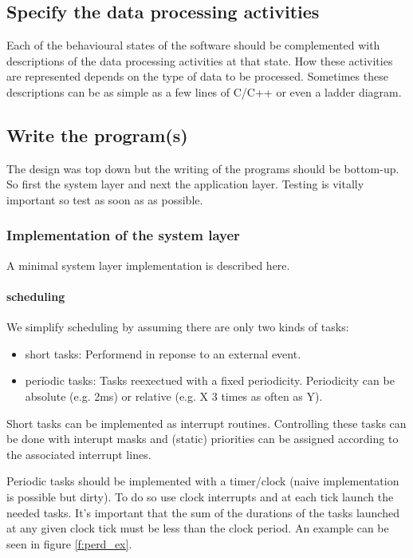 \documentclass[../main.tex]{subfiles}
\begin{document}
\subsection{Specify the data processing activities}
\label{sss:activities}
Each of the behavioural states of the software should be complemented with descriptions of the data processing activities at that state.
How these activities are represented depends on the type of data to be processed.
Sometimes these descriptions can be as simple as a few lines of C/C++ or even a ladder diagram.




\subsection{Write the program(s)}
\label{sss:write}
The design was top down but the writing of the programs should be bottom-up. So first the system layer and next the application layer. 
Testing is vitally important so test as soon as as possible.

\subsubsection{Implementation of the system layer}
A minimal system layer implementation is described here.

\paragraph{scheduling}
We simplify scheduling by assuming there are only two kinds of tasks:
\begin{itemize}
	\item short tasks: Performend in reponse to an external event.
	\item periodic tasks: Tasks reexectued with a fixed periodicity. Periodicity can be absolute (e.g. 2ms) or relative (e.g. X 3 times as often as Y).
\end{itemize}

Short tasks can be implemented as interrupt routines. 
Controlling these tasks can be done with interupt masks and (static) priorities can be assigned according to the associated interrupt lines.

Periodic tasks should be implemented with a timer/clock (naive implementation is possible but dirty).
To do so use clock interrupts and at each tick launch the needed tasks.
It's important that the sum of the durations of the tasks launched at any given clock tick must be less than the clock period. 
An example can be seen in figure \ref{f:perd_ex}.
\end{document}
